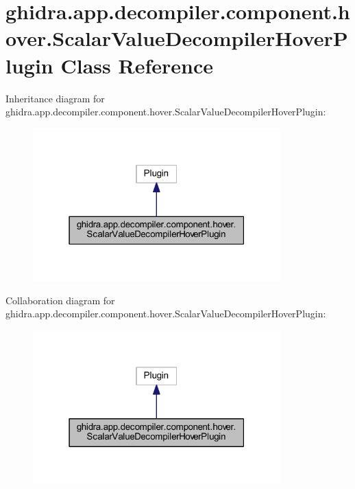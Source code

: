 \hypertarget{classghidra_1_1app_1_1decompiler_1_1component_1_1hover_1_1_scalar_value_decompiler_hover_plugin}{}\section{ghidra.\+app.\+decompiler.\+component.\+hover.\+Scalar\+Value\+Decompiler\+Hover\+Plugin Class Reference}
\label{classghidra_1_1app_1_1decompiler_1_1component_1_1hover_1_1_scalar_value_decompiler_hover_plugin}


Inheritance diagram for ghidra.\+app.\+decompiler.\+component.\+hover.\+Scalar\+Value\+Decompiler\+Hover\+Plugin\+:
\nopagebreak
\begin{figure}[H]
\begin{center}
\leavevmode
\includegraphics[width=271pt]{classghidra_1_1app_1_1decompiler_1_1component_1_1hover_1_1_scalar_value_decompiler_hover_plugin__inherit__graph}
\end{center}
\end{figure}


Collaboration diagram for ghidra.\+app.\+decompiler.\+component.\+hover.\+Scalar\+Value\+Decompiler\+Hover\+Plugin\+:
\nopagebreak
\begin{figure}[H]
\begin{center}
\leavevmode
\includegraphics[width=271pt]{classghidra_1_1app_1_1decompiler_1_1component_1_1hover_1_1_scalar_value_decompiler_hover_plugin__coll__graph}
\end{center}
\end{figure}

